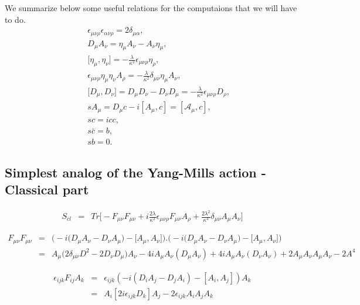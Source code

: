 \documentclass[a4paper,11pt]{article} %
\numberwithin{equation}{section} %
\numberwithin{figure}{section} %
\theoremstyle{plain} %
\theoremstyle{definition} %
\theoremstyle{remark} %
\begin{document}
\noindent
We summarize below some useful relations for the computaions that we will have to do.
\begin{eqnarray*}
 && \epsilon_{\mu \nu \rho} \epsilon_{\alpha \nu \rho} = 2 \delta_{\mu \alpha}, \\
 && D_\mu A_\nu = \eta_\mu A_\nu - A_\nu \eta_\mu ,\\
 && \big[ \eta_\mu , \eta_\nu \big] = - \frac{\lambda}{\kappa^2} \epsilon_{\mu \nu \rho} \eta_\rho ,\\
 && \epsilon_{\mu \nu \rho} \eta_\mu \eta_\nu A_\rho = - \frac{\lambda}{\kappa^2} \delta_{\mu \nu} \eta_\mu A_\nu ,\\
 && \big[ D_\mu , D_\nu \big] = D_\mu D_\nu - D_\nu D_\mu = - \frac{\lambda}{\kappa^2} \epsilon_{\mu \nu \rho} D_\rho ,\\
 && s A_\mu = D_\mu c - i [A_\mu,c] = [ \mathcal{A}_\mu , c] ,\\
 && sc = icc ,\\
 && s\bar{c} = b ,\\
 && sb = 0 .
\end{eqnarray*}

\subsection*{Simplest analog of the Yang-Mills action - Classical part}

\begin{eqnarray*}
 S_{cl} &=& Tr \Big[ -F_{\mu \nu} F_{\mu \nu}+i\frac{2\lambda}{\kappa^2} \epsilon_{\mu \nu \rho} F_{\mu \nu} A_{\rho} + \frac{2\lambda^2}{\kappa^4} \delta_{\mu \nu} A_\mu A_\nu \Big]
\end{eqnarray*}
   
\begin{eqnarray*}
 F_{\mu \nu} F_{\mu \nu} &=& \Bigg( - i \Big( D_{\mu} A_{\nu}  -  D_{\nu} A_{\mu} \Big) - \Big[A_{\mu},A_{\nu} \Big] \Bigg) . \Bigg( - i \Big( D_{\mu} A_{\nu}  -  D_{\nu} A_{\mu} \Big) - \Big[A_{\mu},A_{\nu}\Big] \Bigg) \\
                         &=& A_\mu \Big( 2 \delta_{\mu \nu} D^2 - 2 D_\nu D_\mu \Big) A_\nu - 4i A_\mu A_\nu (D_\mu A_\nu) + 4i A_\mu A_\nu (D_\nu A_\nu) + 2 A_\mu A_\nu A_\mu A_\nu - 2 A^4
\end{eqnarray*}

\begin{eqnarray*}
 \epsilon_{ijk} F_{ij} A_k &=& \epsilon_{ijk} \left( - i ( D_{i} A_{j}  -  D_{j} A_{i} ) - [ A_{i} , A_{j} ] \right) A_k \\
                              &=& A_i \left[ 2 i \epsilon_{ijk}  D_k \right] A_j - 2 \epsilon_{ijk} A_i A_j A_k 
\end{eqnarray*}
\end{document}
